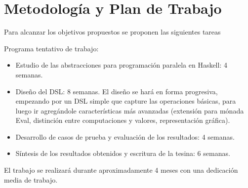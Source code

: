 \section{Metodología y Plan de Trabajo}
\iffalse
Se recomienda estructurar esta sección en función de los objetivos específicos.
* Planteo de la hipotesis a analizar en cada objetivo o seccion del proyecto.
* Actividades propuestas y metodologıa a usar en cada una de ellas.
* Resultados que se esperan obtener o metas a cumplir y como se evaluaran
los resultados.
Trate de evaluar los potenciales problemas y limitaciones de la metodolog ́ıa
y t ́ecnicas propuestas y en lo posible proponer alternativas.
\fi

Para alcanzar los objetivos propuestos se proponen las siguientes tareas

Programa tentativo de trabajo:
\begin{itemize}
  \item Estudio de las abstracciones para programaci\'on paralela en Haskell: 4 semanas.
  \item Dise\~no del DSL: 8 semanas. El dise\~no se har\'a en forma
    progresiva, empezando por un DSL simple que capture las
    operaciones b\'asicas, para luego ir
    agreg\'andole caracter\'isticas m\'as avanzadas (extensi\'on para
    m\'onada Eval, distinci\'on entre computaciones y valores,
    representaci\'on gr\'afica).
  \item Desarrollo de casos de prueba y evaluaci\'on de los resultados: 4 semanas.
  \item S\'intesis de los resultados obtenidos y escritura de la tesina: 6 semanas.
\end{itemize}
El trabajo se realizará durante aproximadamente 4 meses con una
dedicación media de trabajo.

